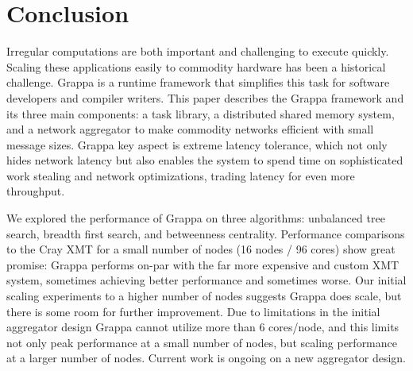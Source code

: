 \section{Conclusion}

Irregular computations are both important and challenging to execute quickly.
Scaling these applications easily to commodity hardware has been a historical
challenge. Grappa is a runtime framework that simplifies this task for
software developers and compiler writers. This paper describes the Grappa
framework and its three main components: a task library, a distributed shared
memory system, and a network aggregator to make commodity networks efficient
with small message sizes. Grappa key aspect is extreme latency tolerance,
which not only hides network latency but also enables the system to spend time
on sophisticated work stealing and network optimizations, trading latency for
even more throughput.

We explored the performance of Grappa on three algorithms: unbalanced tree
search, breadth first search, and betweenness centrality. Performance
comparisons to the Cray XMT for a small number of nodes (16 nodes / 96 cores)
show great promise: Grappa performs on-par with the far more expensive and
custom XMT system, sometimes achieving better performance and sometimes worse.
Our initial scaling experiments to a higher number of nodes suggests Grappa
does scale, but there is some room for further improvement. Due to limitations
in the initial aggregator design Grappa cannot utilize more than 6 cores/node,
and this limits not only peak performance at a small number of nodes, but
scaling performance at a larger number of nodes. Current work is ongoing on a
new aggregator design.
